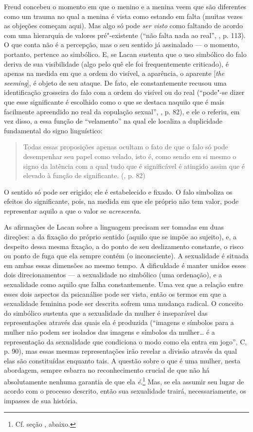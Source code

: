 Freud concebeu o momento em que o menino e a menina veem que são
diferentes como um trauma no qual a menina é vista como estando em falta
(muitas vezes as objeções começam aqui). Mas algo só pode \emph{ser
visto} como faltando de acordo com uma hierarquia de valores
pré"-existente (``não falta nada ao real'', , p. 113). O que conta não
é a percepção, mas o seu sentido já assinalado --- o momento, portanto,
pertence ao simbólico. E, se Lacan sustenta que o uso simbólico do falo
deriva de sua visibilidade (algo pelo quê ele foi frequentemente
criticado), é apenas na medida em que a ordem do visível, a aparência, o
aparente {[}\emph{the seeming}{]}, é objeto de seu ataque. De fato, ele
constantemente recusou uma identificação grosseira do falo com a ordem
do visível ou do real (``pode"-se dizer que esse significante é escolhido
como o que se destaca naquilo que é mais facilmente apreendido no real
da copulação sexual'', , p. 82), e ele o referiu, em vez disso, a essa
função de ``velamento'' na qual ele localiza a duplicidade fundamental
do signo linguístico:

\begin{quote}
Todas essas proposições apenas ocultam o fato de que o falo só pode
desempenhar seu papel como velado, isto é, como sendo em si mesmo o
signo da latência com a qual tudo que é significável é atingido assim
que é elevado à função de significante. (, p. 82)
\end{quote}

O sentido só pode ser erigido; ele é estabelecido e fixado. O falo
simboliza os efeitos do significante, pois, na medida em que ele próprio
não tem valor, pode representar aquilo a que o valor se
\emph{acrescenta}.

As afirmações de Lacan sobre a linguagem precisam ser tomadas em duas
direções: a da fixação do próprio sentido (aquilo que se impõe ao
sujeito), e, a despeito dessa mesma fixação, a do ponto de seu
deslizamento constante, o risco ou ponto de fuga que ela sempre contém
(o inconsciente). A sexualidade é situada em ambas essas dimensões ao
mesmo tempo. A dificuldade é manter unidos esses dois direcionamentos ---
a sexualidade no simbólico (uma ordenação), e a sexualidade como aquilo
que falha constantemente. Uma vez que a relação entre esses dois
aspectos da psicanálise pode ser vista, então os termos em que a
sexualidade feminina pode ser descrita sofrem uma mudança radical. O
conceito do simbólico sustenta que a sexualidade da mulher é inseparável
das representações através das quais ela é produzida (``imagens e
símbolos para a mulher não podem ser isolados das imagens e símbolos da
mulher\ldots{} é a representação da sexualidade que condiciona o modo como
ela entra em jogo'', C, p. 90), mas essas mesmas representações irão
revelar a divisão através da qual elas são constituídas enquanto tais. A
questão sobre o que é uma mulher, nesta abordagem, sempre esbarra no
reconhecimento crucial de que não há absolutamente nenhuma garantia de
que ela \emph{é}.\footnote{Cf. seção , abaixo.} Mas, se ela assumir
seu lugar de acordo com o processo descrito, então sua sexualidade
trairá, necessariamente, os impasses de sua história.

